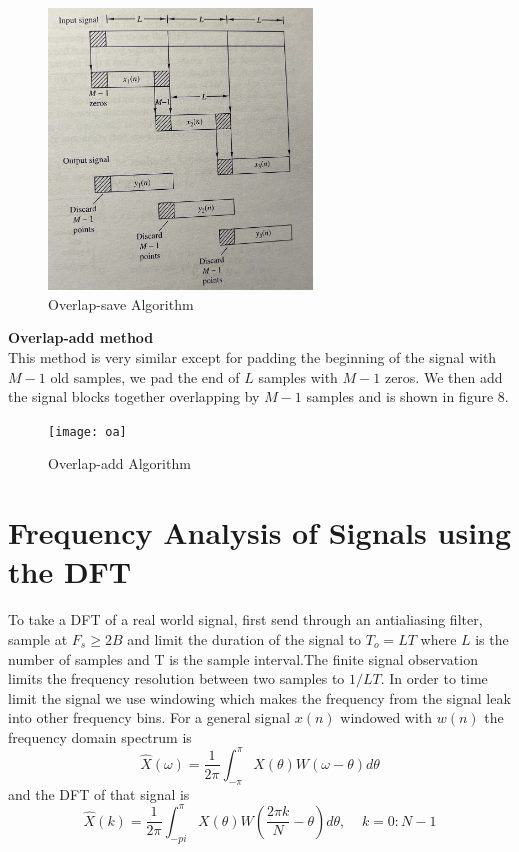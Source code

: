 \documentclass{article} %
\begin{document}
	\begin{figure}[h]
	\centering
	\includegraphics[width=7cm]{os}
	\caption{Overlap-save Algorithm}
	\end{figure}
	\textbf{Overlap-add method}\\
	This method is very similar except for padding the beginning of the signal with $M-1$ old samples, we pad the end of $L$ samples with $M-1$ zeros. We then add the signal blocks together overlapping by $M-1$ samples and is shown in figure 8.
	
	\begin{figure}[h]
	\centering
	\texttt{[image: oa]}
	\caption{Overlap-add Algorithm}
	\end{figure}
	
	\section{Frequency Analysis of Signals using the DFT}
	To take a DFT of a real world signal, first send through an antialiasing filter, sample at $F_s \ge 2B$ and limit the duration of the signal to $T_o = LT$ where $L$ is the number of samples and T is the sample interval.The finite signal observation limits the frequency resolution between two samples to $1/LT$. In order to time limit the signal we use windowing which makes the frequency from the signal leak into other frequency bins. For a general signal $x(n)$ windowed with $w(n)$ the frequency domain spectrum is 
	\begin{equation}
	\hat{X}(\omega) = \frac{1}{2\pi}\int_{-\pi}^{\pi} X(\theta)W(\omega - \theta)d\theta
	\end{equation}
	and the DFT of that signal is
	\begin{equation}
	\hat{X}(k) = \frac{1}{2\pi} \int_{-pi}^{\pi} X(\theta)W(\frac{2\pi k}{N} - \theta)d\theta, \;\;\;\; k=0:N-1
	\end{equation}
	
\end{document}
